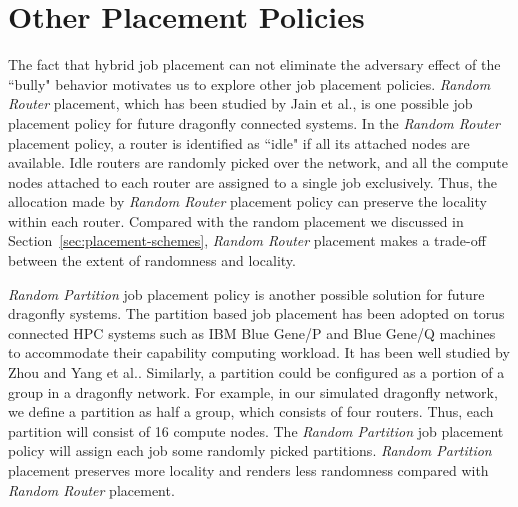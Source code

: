 \section{Other Placement Policies}
\label{sec: other_placement_policies}

The fact that hybrid job placement can not eliminate the adversary effect of the ``bully" behavior motivates us to explore other job placement policies. 
\textit{Random Router} placement, which has been studied by Jain et al.\cite{jain-sc14}, is one possible job placement policy for future dragonfly connected systems. 
In the \textit{Random Router} placement policy, a router is identified as ``idle" if all its attached nodes are available. 
Idle routers are randomly picked over the network, and all the compute nodes attached to each router are assigned to a single job exclusively. 
Thus, the allocation made by \textit{Random Router} placement policy can preserve the locality within each router.
Compared with the random placement we discussed in Section~\ref{sec:placement-schemes}, \textit{Random Router} placement makes a trade-off between the extent of randomness and locality. 

\textit{Random Partition} job placement policy is another possible solution for future dragonfly systems.
The partition based job placement has been adopted on torus connected HPC systems such as IBM Blue Gene/P and Blue Gene/Q machines to accommodate their capability computing workload.  
It has been well studied by Zhou and Yang et al.\cite{zhou-ipdps-2015}\cite{Yang-Cluster14}\cite{Yang-ICPADS16}. 
Similarly, a partition could be configured as a portion of a group in a dragonfly network. 
For example, in our simulated dragonfly network, we define a partition as half a group, which consists of four routers. Thus, each partition will consist of 16 compute nodes.
The \textit{Random Partition} job placement policy will assign each job some randomly picked partitions. 
\textit{Random Partition} placement preserves more locality and renders less randomness compared with \textit{Random Router} placement.


